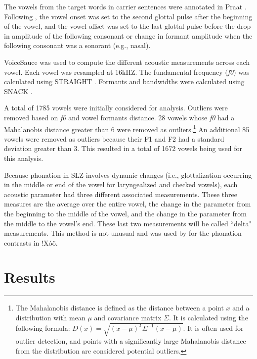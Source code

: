 \documentclass[12pt, letterpaper]{article}
\begin{document}
The vowels from the target words in carrier sentences were annotated in Praat \citep{boersmaPraatDoingPhonetics2021}. Following \citet{garellekAcousticDiscriminabilityComplex2020}, the vowel onset was set to the second glottal pulse after the beginning of the vowel, and the vowel offset was set to the last glottal pulse before the drop in amplitude of the following consonant or change in formant amplitude when the following consonant was a sonorant (e.g., nasal). 

VoiceSauce \citep{shueVOICESAUCEProgramVoice2009} was used to compute the different acoustic measurements across each vowel. Each vowel was resampled at 16kHZ. The fundamental frequency (\textit{f0}) was calculated using STRAIGHT \citep{kawaharaInstantaneousfrequencybasedPitchExtraction1998}. Formants and bandwidths were calculated using SNACK \citep{sjolanderSnackSoundToolkit2004}.

A total of 1785 vowels were initially considered for analysis. Outliers were removed based on \textit{f0} and vowel formants distance. 28 vowels whose \textit{f0} had a Mahalanobis distance greater than 6 were removed as outliers.\footnote{The Mahalanobis distance is defined as the distance between a point $x$ and a distribution with mean $\mu$ and covariance matrix $\Sigma$. It is calculated using the following formula: $D(x) = \sqrt{ (x - \mu)^T \Sigma^{-1} (x - \mu) }$. It is often used for outlier detection, and points with a significantly large Mahalanobis distance from the distribution are considered potential outliers.} An additional 85 vowels were removed as outliers because their F1 and F2 had a standard deviation greater than 3. This resulted in a total of 1672 vowels being used for this analysis.

Because phonation in SLZ involves dynamic changes (i.e., glottalization occurring in the middle or end of the vowel for laryngealized and checked vowels), each acoustic parameter had three different associated measurements. These three measures are the average over the entire vowel, the change in the parameter from the beginning to the middle of the vowel, and the change in the parameter from the middle to the vowel’s end. These last two measurements will be called ``delta" measurements. This method is not unusual and was used by \citet{garellekAcousticDiscriminabilityComplex2020} for the phonation contrasts in !Xóõ.  

\section{Results} \label{sec:Results}
\end{document}
